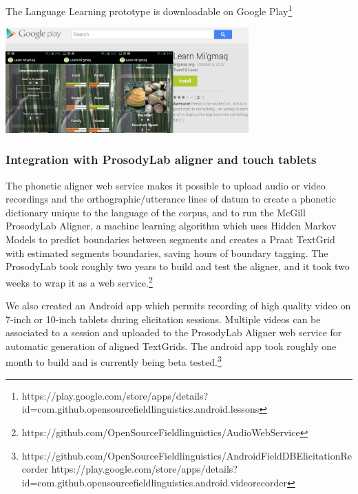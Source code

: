 \documentclass[letterpaper, 12pt, dvips]{mitwpl}
\begin{document}
\begin{exe} 
\ex The Language Learning prototype is downloadable on Google Play\footnote{https://play.google.com/store/apps/details?id=com.github.opensourcefieldlinguistics.android.lessons}

 \centering
   \includegraphics[width=0.7\textwidth]{languageLearningApp} 

\label{ex:languageLearningApp}
\end{exe}

\subsubsection{Integration with ProsodyLab aligner and touch tablets}
\label{sec:phoneticwebservice}

The phonetic aligner web service makes it possible to upload audio or video recordings and the orthographic/utterance lines of datum to create a phonetic dictionary unique to the language of the corpus,
and to run the McGill ProsodyLab Aligner,
a machine learning algorithm which uses Hidden Markov Models to predict boundaries between segments and creates a Praat TextGrid with estimated segments boundaries,
saving hours of boundary tagging. The ProsodyLab took roughly two years to build and test the aligner, and it took two weeks to wrap it as a web service.\footnote{https://github.com/OpenSourceFieldlinguistics/AudioWebService}


We also created an Android app which permits recording of high quality video on 7-inch or 10-inch tablets during elicitation sessions.
Multiple videos can be associated to a session and uploaded to the ProsodyLab Aligner web service for automatic generation of aligned TextGrids. The android app took roughly one month to build and is currently being beta tested.\footnote{https://github.com/OpenSourceFieldlinguistics/AndroidFieldDBElicitationRecorder  \indent https://play.google.com/store/apps/details?id=com.github.opensourcefieldlinguistics.android.videorecorder}
\end{document}
